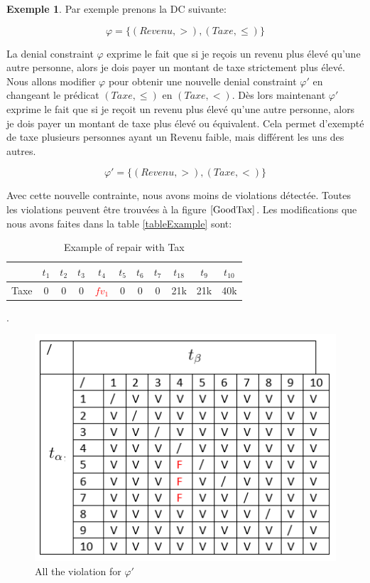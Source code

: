 \documentclass[letterpaper, 12pt]{report}
\theoremstyle{definition}
\newtheorem{myexample}{Exemple}
\begin{document}
\begin{myexample}
Par exemple prenons la DC suivante:

$$ \varphi = \{(Revenu,>),(Taxe,\leq) \} $$

La denial constraint $\varphi$ exprime le fait que si je reçois un revenu plus élevé qu'une autre personne, alors je dois payer un montant de taxe strictement plus élevé. Nous allons modifier $\varphi$ pour obtenir une nouvelle denial constraint $\varphi'$ en changeant le prédicat $(Taxe,\leq)$ en $(Taxe,<)$. Dès lors maintenant $\varphi'$ exprime le fait que si je reçoit un revenu plus élevé qu'une autre personne, alors je dois payer un montant de taxe plus élevé ou équivalent. Cela permet d'exempté de taxe plusieurs personnes ayant un Revenu faible, mais différent les uns des autres. 

$$ \varphi' = \{(Revenu,>),(Taxe,<) \} $$

Avec cette nouvelle contrainte, nous avons moins de violations détectée. Toutes les violations peuvent être trouvées à la figure $\ref{GoodTax}$. Les modifications que nous avons faites dans la table \ref{tableExample} sont:

\begin{table}[H]
	\centering
	\begin{tabular}{|c|c c c c c c c c c c|}
	\hline
	   & $t_1$ & $t_2$ & $t_3$ &$t_4$ &$t_5$ &$t_6$ &$t_7$ &$t_18$ &$t_9$ &$t_10$ \\
	\hline
	 Taxe & 0 & 0 & 0 & \textcolor{red}{$fv_1$} & 0 & 0 & 0 & 21k & 21k & 40k\\
	 \hline
	\end{tabular}
	\caption{\label{tableExample2} Example of repair with Tax}.
\end{table}


\begin{figure}
	\centering
	\includegraphics[scale=1]{img/TaxGood}
	\caption{\label{GoodTax} All the violation for $\varphi '$}
\end{figure}


\end{myexample}
\end{document}
